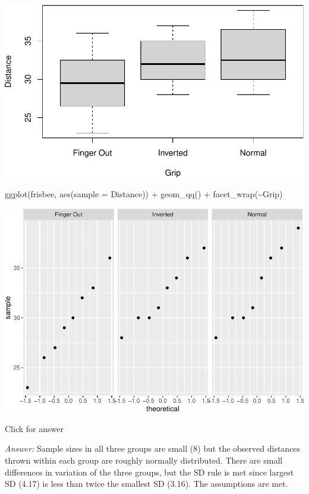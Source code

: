 \documentclass[
]{book}
\newenvironment{Shaded}{\begin{snugshade}}{\end{snugshade}}
\newcommand{\AttributeTok}[1]{\textcolor[rgb]{0.77,0.63,0.00}{#1}}
\newcommand{\FunctionTok}[1]{\textcolor[rgb]{0.00,0.00,0.00}{#1}}
\newcommand{\NormalTok}[1]{#1}
\newcommand{\SpecialCharTok}[1]{\textcolor[rgb]{0.00,0.00,0.00}{#1}}
\begin{document}
\includegraphics[width=1\linewidth]{Class_Activity_22_files/figure-latex/unnamed-chunk-3-1}

\begin{Shaded}
\begin{Highlighting}[]
\FunctionTok{ggplot}\NormalTok{(frisbee, }\FunctionTok{aes}\NormalTok{(}\AttributeTok{sample =}\NormalTok{ Distance)) }\SpecialCharTok{+} \FunctionTok{geom\_qq}\NormalTok{() }\SpecialCharTok{+} \FunctionTok{facet\_wrap}\NormalTok{(}\SpecialCharTok{\textasciitilde{}}\NormalTok{Grip)}
\end{Highlighting}
\end{Shaded}

\includegraphics[width=1\linewidth]{Class_Activity_22_files/figure-latex/unnamed-chunk-3-2}

Click for answer

\emph{Answer:} Sample sizes in all three groups are small (8) but the observed distances thrown within each group are roughly normally distributed. There are small differences in variation of the three groups, but the SD rule is met since largest SD (4.17) is less than twice the smallest SD (3.16). The assumptions are met.
\end{document}
